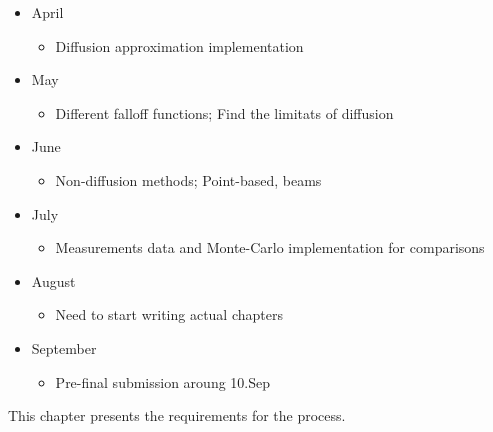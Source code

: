 \begin{itemize}
    \item{April}
        \begin{itemize}
          \item{Diffusion approximation implementation}
        \end{itemize}
    \item{May}
        \begin{itemize}
          \item{Different falloff functions; Find the limitats of diffusion}
        \end{itemize}
    \item{June}
        \begin{itemize}
          \item{Non-diffusion methods; Point-based, beams}
        \end{itemize}
    \item{July}
        \begin{itemize}
          \item{Measurements data and Monte-Carlo implementation for
          comparisons}
        \end{itemize}
    \item{August}
        \begin{itemize}
          \item{Need to start writing actual chapters}
        \end{itemize}
    \item{September}
        \begin{itemize}
          \item{Pre-final submission aroung 10.Sep}
        \end{itemize}
\end{itemize}

\noindent  This chapter presents the requirements for the process.